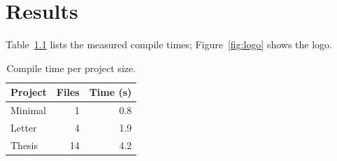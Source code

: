 \chapter{Results}\label{ch:results}

Table~\ref{tab:bench} lists the measured compile times; Figure~\ref{fig:logo} shows the logo.

\begin{table}[ht]
  \centering
  \caption{Compile time per project size.}\label{tab:bench}
  \begin{tabular}{lrr}
    \toprule
    Project & Files & Time (s) \\
    \midrule
    Minimal & 1  & 0.8 \\
    Letter  & 4  & 1.9 \\
    Thesis  & 14 & 4.2 \\
    \bottomrule
  \end{tabular}
\end{table}


